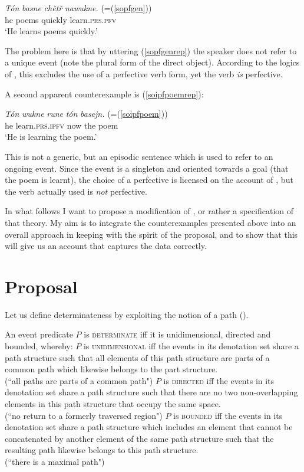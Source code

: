 \documentclass[output=paper,colorlinks,citecolor=brown]{langscibook}
\begin{document}
  \ea\label{sopfgenrep}
\gll \textit{T\'on} \textit{basne} \textit{chětř} \textit{nawukne.} (=(\ref{sopfgen})) \\
he poems quickly learn.\textsc{prs.pfv}\\
\glt \normalsize{`He learns poems quickly.'}
\z

\noindent The problem here is that by uttering (\ref{sopfgenrep}) 
the speaker does not refer to a unique event (note the plural form of the direct object). According to the logics of \citet{Toops2001}, this excludes the use of a perfective verb form, yet the verb \textit{is} perfective.  

A second apparent counterexample is 
(\ref{soipfpoemrep}):

 \ea\label{soipfpoemrep}
\gll \textit{T\'on} \textit{wukne} \textit{rune} \textit{t\'on} \textit{basejn.} (=(\ref{soipfpoem})) \\
he learn.\textsc{prs.ipfv} now the poem\\
\glt \normalsize{`He is learning the poem.'}
\z

\noindent This is not a generic, but an episodic sentence which is used to refer to an ongoing 
event. Since the event is a singleton and oriented towards a goal (that the poem is learnt), the choice of a perfective is licensed on the account of \citet{Toops2001}, but the verb actually used is \textit{not} perfective. 

In what follows I want to propose a modification of 
\citet{Toops2001}, or rather a specification of that theory. 
My aim is to integrate the counterexamples presented above into an overall approach in keeping with the spirit of the proposal, and to show that this will give us an account that captures the data correctly. 


\section{Proposal}\label{mueller:sec:proposal}
Let us define determinateness by exploiting the notion of a path (\citealt{Gehrke2008, Krifka1998, Zwarts2005}). 

 \ea\label{defdet}
An event predicate $P$ is \textsc{determinate} iff it is unidimensional, directed and bounded, whereby:
\ea\label{defuni}
$P$ is \textsc{unidimensional} iff the events in its denotation set share a path structure such that all elements of this path structure are parts of a common path which likewise belongs to the part structure.\\ (``all paths are parts of a common path")
\ex\label{defdir}
$P$ is \textsc{directed} iff the events in its denotation set share a path structure such that there are no two non-overlapping elements in this path structure that occupy the same space. \\
(``no return to a formerly traversed region")
\ex\label{defbound}
$P$ is \textsc{bounded} iff the events in its denotation set share a path structure which includes an element that cannot be concatenated by another element of the same path structure such that the resulting path likewise belongs to this path structure.\\
(``there is a maximal path")
\z
\z
\end{document}
